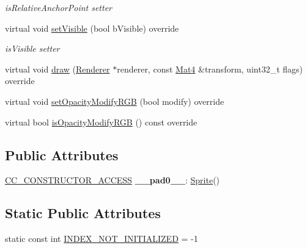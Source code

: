 \begin{Indent}
\begin{DoxyCompactItemize}
\begin{DoxyCompactList}\small\item\em is\+Relative\+Anchor\+Point setter \end{DoxyCompactList}\item 
virtual void \hyperlink{classSprite_a5bf8d98b0feb78acf0bbf4b3b3fa6d59}{set\+Visible} (bool b\+Visible) override
\begin{DoxyCompactList}\small\item\em is\+Visible setter \end{DoxyCompactList}\item 
virtual void \hyperlink{classSprite_a6f6d6ad4411cf330f18663f04952fdf6}{draw} (\hyperlink{classRenderer}{Renderer} $\ast$renderer, const \hyperlink{classMat4}{Mat4} \&transform, uint32\+\_\+t flags) override
\item 
virtual void \hyperlink{classSprite_a4b86bd0afb6fa3bb3ed5521041800458}{set\+Opacity\+Modify\+R\+GB} (bool modify) override
\item 
virtual bool \hyperlink{classSprite_af25cfe5f1f6178f5a13db86a258848d0}{is\+Opacity\+Modify\+R\+GB} () const override
\end{DoxyCompactItemize}
\end{Indent}
\subsection*{Public Attributes}
\begin{DoxyCompactItemize}
\item 
\mbox{\label{classSprite_a135283b9b4ec572608502c8e1db6ca29}} 
\hyperlink{_2cocos2d_2cocos_2base_2ccConfig_8h_a25ef1314f97c35a2ed3d029b0ead6da0}{C\+C\+\_\+\+C\+O\+N\+S\+T\+R\+U\+C\+T\+O\+R\+\_\+\+A\+C\+C\+E\+SS} {\bfseries \+\_\+\+\_\+pad0\+\_\+\+\_\+}\+: \hyperlink{classSprite}{Sprite}()
\end{DoxyCompactItemize}
\subsection*{Static Public Attributes}
\begin{DoxyCompactItemize}
\item 
static const int \hyperlink{classSprite_a56a1e71b208df002ffce86f0c8a1fe03}{I\+N\+D\+E\+X\+\_\+\+N\+O\+T\+\_\+\+I\+N\+I\+T\+I\+A\+L\+I\+Z\+ED} = -\/1
\end{DoxyCompactItemize}
